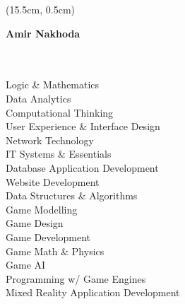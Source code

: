 \documentclass[a4paper,10pt]{article}
\begin{document}
  \begin{textblock*}{5cm}(15.5cm, 0.5cm)
    \small {}
  \end{textblock*}

  \begin{center}
    \Huge \textbf{Amir Nakhoda}\\
    \vspace{0.2cm}
    \normalsize
    \makebox[\linewidth]{\rule{\paperwidth}{0.6pt}}
  \end{center}
    
  \setlength{\columnsep}{0.5cm}
  \begin{paracol}{2}
    \begin{leftcolumn}
      \Large\noindent{}
      \vspace{0.15cm}\\
      \normalsize{}\\
      \small\lato
      Logic \& Mathematics\\
      Data Analytics\\
      Computational Thinking\\
      User Experience \& Interface Design\\
      Network Technology\\
      IT Systems \& Essentials\\
      Database Application Development\\
      Website Development\\
      Data Structures \& Algorithms\\
      Game Modelling\\
      Game Design\\
      Game Development\\
      Game Math \& Physics\\
      Game AI\\
      Programming w/ Game Engines\\
      Mixed Reality Application Development

      \vspace{0.35cm}

      \Large\noindent{}
      \vspace{0.15cm}\\
      \normalsize
      \href{https://www.linkedin.com/in/amir-nakhoda/}{}\\
      \href{https://github.com/NakhodaAmir}{}
      

\end{leftcolumn}
\end{paracol}
\end{document}
